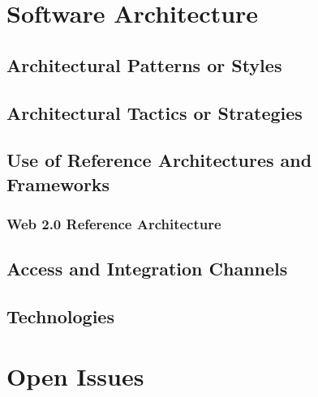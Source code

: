 \documentclass[a4paper,12pt]{article}
\begin{document}
\newpage
\section{Software Architecture}

\subsection{Architectural Patterns or Styles}

\subsection{Architectural Tactics or Strategies}

\subsection{Use of Reference Architectures and Frameworks}

\subsubsection{Web 2.0 Reference Architecture}

\subsection{Access and Integration Channels}

\subsection{Technologies}

\newpage
\section{Open Issues}
\end{document}
